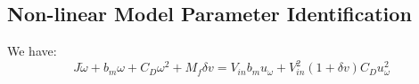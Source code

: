 \subsection{Non-linear Model Parameter Identification}
We have:
\begin{equation*}
    J \dot \omega + b_m \omega + C_D \omega^2 + M_f \delta v = V_{in} b_m u_\omega + V_{in}^2 (1 + \delta v) C_D u_\omega^2
\end{equation*}







